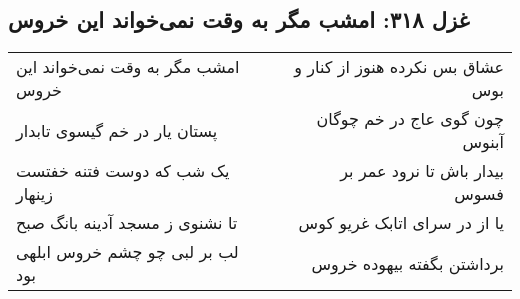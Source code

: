 \begin{center}
\section*{غزل ۳۱۸: امشب مگر به وقت نمی‌خواند این خروس}
\label{sec:318}
\begin{longtable}{l p{0.5cm} r}
امشب مگر به وقت نمی‌خواند این خروس
&&
عشاق بس نکرده هنوز از کنار و بوس
\\
پستان یار در خم گیسوی تابدار
&&
چون گوی عاج در خم چوگان آبنوس
\\
یک شب که دوست فتنه خفتست زینهار
&&
بیدار باش تا نرود عمر بر فسوس
\\
تا نشنوی ز مسجد آدینه بانگ صبح
&&
یا از در سرای اتابک غریو کوس
\\
لب بر لبی چو چشم خروس ابلهی بود
&&
برداشتن بگفته بیهوده خروس
\\
\end{longtable}
\end{center}
